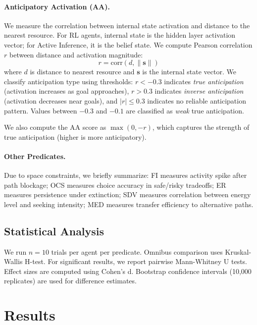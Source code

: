 \documentclass{article}
\begin{document}
\paragraph{Anticipatory Activation (AA).} We measure the correlation between internal state activation and distance to the nearest resource. For RL agents, internal state is the hidden layer activation vector; for Active Inference, it is the belief state. We compute Pearson correlation $r$ between distance and activation magnitude:
\begin{equation}
    r = \text{corr}(d, \|\mathbf{s}\|)
\end{equation}
where $d$ is distance to nearest resource and $\mathbf{s}$ is the internal state vector. We classify anticipation type using thresholds: $r < -0.3$ indicates \textit{true anticipation} (activation increases as goal approaches), $r > 0.3$ indicates \textit{inverse anticipation} (activation decreases near goals), and $|r| \leq 0.3$ indicates no reliable anticipation pattern. Values between $-0.3$ and $-0.1$ are classified as \textit{weak} true anticipation.

We also compute the AA score as $\max(0, -r)$, which captures the strength of true anticipation (higher is more anticipatory).

\paragraph{Other Predicates.} Due to space constraints, we briefly summarize: FI measures activity spike after path blockage; OCS measures choice accuracy in safe/risky tradeoffs; ER measures persistence under extinction; SDV measures correlation between energy level and seeking intensity; MED measures transfer efficiency to alternative paths.

\subsection{Statistical Analysis}

We run $n=10$ trials per agent per predicate. Omnibus comparison uses Kruskal-Wallis H-test. For significant results, we report pairwise Mann-Whitney U tests. Effect sizes are computed using Cohen's d. Bootstrap confidence intervals (10,000 replicates) are used for difference estimates.

\section{Results}
\end{document}
